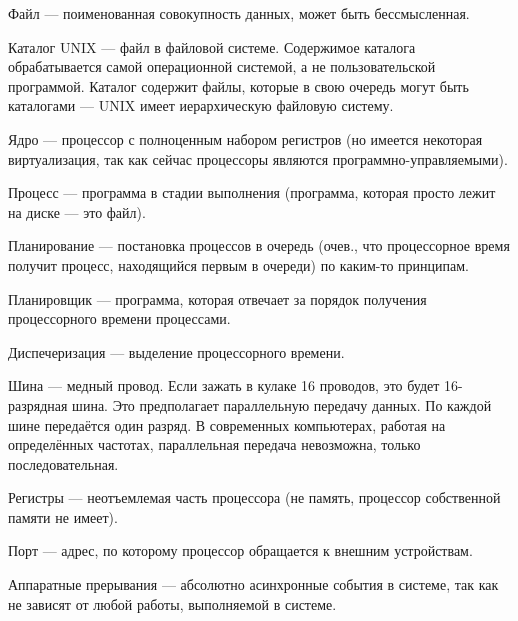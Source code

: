 Файл --- поименованная совокупность данных, может быть бессмысленная.

Каталог UNIX --- файл в файловой системе.
Содержимое каталога обрабатывается самой операционной системой, а не пользовательской программой.
Каталог содержит файлы, которые в свою очередь могут быть каталогами --- UNIX имеет иерархическую файловую систему.

Ядро --- процессор с полноценным набором регистров (но имеется некоторая виртуализация, так как сейчас процессоры являются программно-управляемыми).

Процесс --- программа в стадии выполнения (программа, которая просто лежит на диске --- это файл).

Планирование --- постановка процессов в очередь (очев., что процессорное время получит процесс, находящийся первым в очереди) по каким-то принципам.

Планировщик --- программа, которая отвечает за порядок получения процессорного времени процессами.

Диспечеризация --- выделение процессорного времени.

Шина --- медный провод.
Если зажать в кулаке 16 проводов, это будет 16-разрядная шина.
Это предполагает параллельную передачу данных.
По каждой шине передаётся один разряд.
В современных компьютерах, работая на определённых частотах, параллельная передача невозможна, только последовательная.

Регистры --- неотъемлемая часть процессора (не память, процессор собственной памяти не имеет).

Порт --- адрес, по которому процессор обращается к внешним устройствам.

Аппаратные прерывания --- абсолютно асинхронные события в системе, так как не зависят от любой работы, выполняемой в системе.
